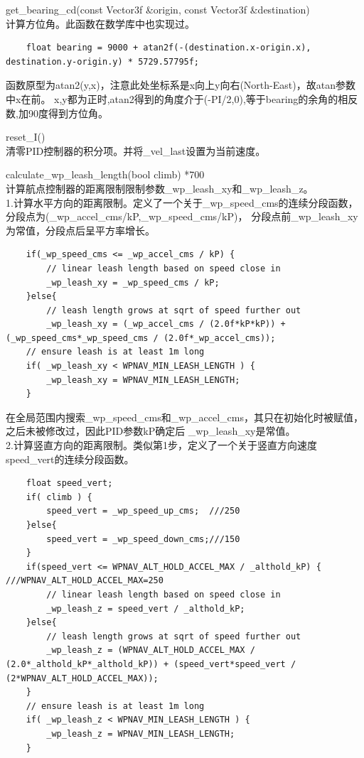 \documentclass[a4paper,10pt]{ctexart} %
\begin{document}
\vspace{8pt}
\noindent get\_bearing\_cd(const Vector3f \&origin, const Vector3f \&destination)\\
计算方位角。此函数在数学库中也实现过。
\begin{lstlisting}
    float bearing = 9000 + atan2f(-(destination.x-origin.x), destination.y-origin.y) * 5729.57795f;
\end{lstlisting}
函数原型为atan2(y,x)，注意此处坐标系是x向上y向右(North-East)，故atan参数中x在前。
x,y都为正时,atan2得到的角度介于(-PI/2,0),等于bearing的余角的相反数,加90度得到方位角。

\vspace{8pt}
\noindent reset\_I()\\
清零PID控制器的积分项。并将\_vel\_last设置为当前速度。

\vspace{8pt}
\noindent calculate\_wp\_leash\_length(bool climb) {\color{red}*700}\\
计算航点控制器的距离限制限制参数\_wp\_leash\_xy和\_wp\_leash\_z。\\
1.计算水平方向的距离限制。定义了一个关于\_wp\_speed\_cms的连续分段函数，分段点为(\_wp\_accel\_cms/kP,\_wp\_speed\_cms/kP)，
分段点前\_wp\_leash\_xy为常值，分段点后呈平方率增长。
\begin{lstlisting}
    if(_wp_speed_cms <= _wp_accel_cms / kP) {
        // linear leash length based on speed close in
        _wp_leash_xy = _wp_speed_cms / kP;
    }else{
        // leash length grows at sqrt of speed further out
        _wp_leash_xy = (_wp_accel_cms / (2.0f*kP*kP)) + (_wp_speed_cms*_wp_speed_cms / (2.0f*_wp_accel_cms));
    // ensure leash is at least 1m long
    if( _wp_leash_xy < WPNAV_MIN_LEASH_LENGTH ) {
        _wp_leash_xy = WPNAV_MIN_LEASH_LENGTH;
    }
\end{lstlisting}
在全局范围内搜索\_wp\_speed\_cms和\_wp\_accel\_cms，其只在初始化时被赋值，之后未被修改过，因此PID参数kP确定后
\_wp\_leash\_xy是常值。\\
2.计算竖直方向的距离限制。类似第1步，定义了一个关于竖直方向速度speed\_vert的连续分段函数。
\begin{lstlisting}
    float speed_vert;
    if( climb ) {
        speed_vert = _wp_speed_up_cms;	///250
    }else{
        speed_vert = _wp_speed_down_cms;///150
    }
    if(speed_vert <= WPNAV_ALT_HOLD_ACCEL_MAX / _althold_kP) {	///WPNAV_ALT_HOLD_ACCEL_MAX=250
        // linear leash length based on speed close in
        _wp_leash_z = speed_vert / _althold_kP;
    }else{
        // leash length grows at sqrt of speed further out
        _wp_leash_z = (WPNAV_ALT_HOLD_ACCEL_MAX / (2.0*_althold_kP*_althold_kP)) + (speed_vert*speed_vert / (2*WPNAV_ALT_HOLD_ACCEL_MAX));
    }
    // ensure leash is at least 1m long
    if( _wp_leash_z < WPNAV_MIN_LEASH_LENGTH ) {
        _wp_leash_z = WPNAV_MIN_LEASH_LENGTH;
    }
\end{lstlisting}
\end{document}
